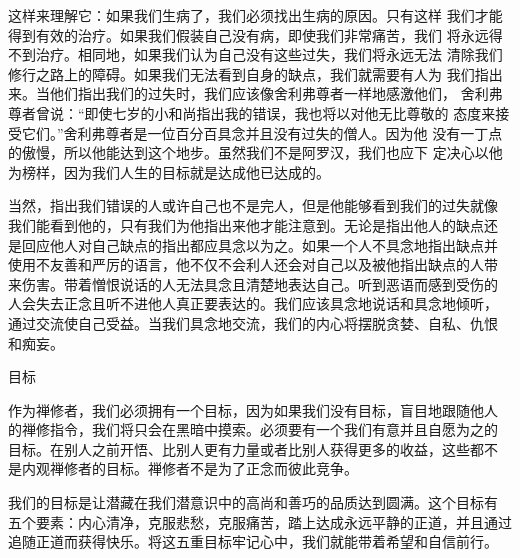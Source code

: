 这样来理解它：如果我们生病了，我们必须找出生病的原因。只有这样
我们才能得到有效的治疗。如果我们假装自己没有病，即使我们非常痛苦，我们
将永远得不到治疗。相同地，如果我们认为自己没有这些过失，我们将永远无法
清除我们修行之路上的障碍。如果我们无法看到自身的缺点，我们就需要有人为
我们指出来。当他们指出我们的过失时，我们应该像舍利弗尊者一样地感激他们，
舍利弗尊者曾说：“即使七岁的小和尚指出我的错误，我也将以对他无比尊敬的
态度来接受它们。”舍利弗尊者是一位百分百具念并且没有过失的僧人。因为他
没有一丁点的傲慢，所以他能达到这个地步。虽然我们不是阿罗汉，我们也应下
定决心以他为榜样，因为我们人生的目标就是达成他已达成的。

当然，指出我们错误的人或许自己也不是完人，但是他能够看到我们的过失就像
我们能看到他的，只有我们为他指出来他才能注意到。无论是指出他人的缺点还
是回应他人对自己缺点的指出都应具念以为之。如果一个人不具念地指出缺点并
使用不友善和严厉的语言，他不仅不会利人还会对自己以及被他指出缺点的人带
来伤害。带着憎恨说话的人无法具念且清楚地表达自己。听到恶语而感到受伤的
人会失去正念且听不进他人真正要表达的。我们应该具念地说话和具念地倾听，
通过交流使自己受益。当我们具念地交流，我们的内心将摆脱贪婪、自私、仇恨
和痴妄。

\subsectcnon 目标

作为禅修者，我们必须拥有一个目标，因为如果我们没有目标，盲目地跟随他人
的禅修指令，我们将只会在黑暗中摸索。必须要有一个我们有意并且自愿为之的
目标。在别人之前开悟、比别人更有力量或者比别人获得更多的收益，这些都不
是内观禅修者的目标。禅修者不是为了正念而彼此竞争。

我们的目标是让潜藏在我们潜意识中的高尚和善巧的品质达到圆满。这个目标有
五个要素：内心清净，克服悲愁，克服痛苦，踏上达成永远平静的正道，并且通过
追随正道而获得快乐。将这五重目标牢记心中，我们就能带着希望和自信前行。

\endchapter

\byebye
